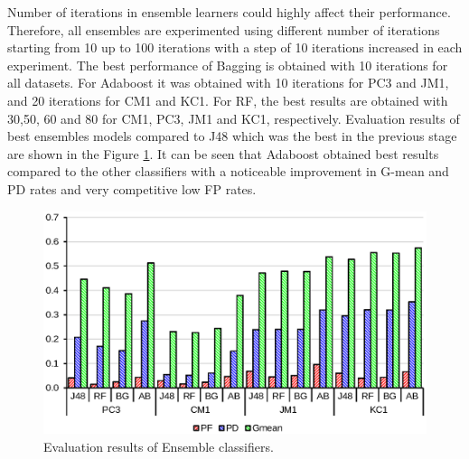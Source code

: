 \documentclass[runningheads,a4paper]{llncs}
\begin{document}
Number of iterations in ensemble learners could highly affect their performance. Therefore, all ensembles are experimented using different number of iterations starting from 10 up to 100 iterations with a step of 10 iterations increased in each experiment. The best performance of Bagging is obtained with 10 iterations for all datasets. For Adaboost it was obtained with 10 iterations for PC3 and JM1, and 20 iterations for CM1 and KC1. For RF, the best results are obtained with 30,50, 60 and 80 for CM1, PC3, JM1 and KC1, respectively. Evaluation results of best ensembles models compared to J48 which was the best in the previous stage are shown in the Figure \ref{fig:ensembles}. It can be seen that Adaboost obtained best results compared to the other classifiers with a noticeable improvement in G-mean and PD rates and very competitive low FP rates.

\begin{figure}[h]
\label{fig:ss}
\begin{center}
\includegraphics[scale=0.7]{Ensembles.eps}
\caption{Evaluation results of Ensemble classifiers.}
\end{center}
\label{fig:ensembles}
\end{figure}
\end{document}

